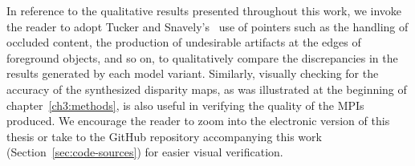 In reference to the qualitative results presented throughout this work, we invoke the reader to adopt Tucker and Snavely's~\cite{single_view_mpi} use of pointers such as the handling of occluded content, the production of undesirable artifacts at the edges of foreground objects, and so on, to qualitatively compare the discrepancies in the results generated by each model variant. Similarly, visually checking for the accuracy of the synthesized disparity maps, as was illustrated at the beginning of chapter~\ref{ch3:methods}, is also useful in verifying the quality of the MPIs produced. We encourage the reader to zoom into the electronic version of this thesis or take to the GitHub repository accompanying this work (Section~\ref{sec:code-sources}) for easier visual verification.




